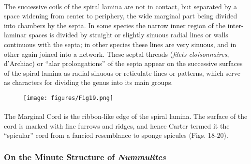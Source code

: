 \documentclass[a4paper, 12pt, oneside]{article}
\begin{document}
\paragraph{}
The successive coils of the spiral lamina are not in contact, but separated by a space widening from center to periphery, the wide marginal part being divided into chambers by the septa. In some species the narrow inner region of the inter-laminar spaces is divided by straight or slightly sinuous radial lines or walls continuous with the septa; in other species these lines are very sinuous, and in other again joined into a network. These septal threads (\emph{filets cloisonnaires}, d'Archiac) or ``alar prolongations'' of the septa appear on the successive surfaces of the spiral lamina as radial sinuous or reticulate lines or patterns, which serve as characters for dividing the genus into its main groups.
\begin{figure}[H]
\centering
\texttt{[image: figures/Fig19.png]}
\caption*{}
\end{figure}
\paragraph{}
The Marginal Cord is the ribbon-like edge of the spiral lamina. The surface of the cord is marked with fine furrows and ridges, and hence Carter termed it the ``spicular'' cord from a fancied resemblance to sponge spicules (Figs. 18-20).
\subsubsection{On the Minute Structure of \emph{Nummulites}}
\end{document}

